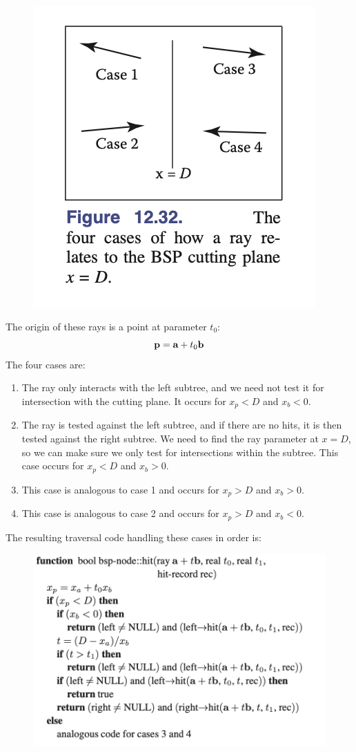 \documentclass[11pt]{article}
\numberwithin{equation}{section}
\begin{document}
	\begin{figure}[H]
	\centering
	\includegraphics[scale=0.6]{p14}
	\end{figure}
The origin of these rays is a point at parameter $t_0$:
$$\textbf{p} = \textbf{a} + t_0 \textbf{b}$$
The four cases are:
\begin{enumerate}
	\item The ray only interacts with the left subtree, and we need not test it for intersection with the cutting plane. It occurs for $x_p < D$ and $x_b < 0$.
	\item The ray is tested against the left subtree, and if there are no hits, it is then tested against the right subtree. We need to find the ray parameter at $x = D$, so we can make sure we only test for intersections within the subtree. This case occurs for $x_p < D$ and $x_b > 0$.
	\item This case is analogous to case 1 and occurs for $x_p > D$ and $x_b > 0$.
	\item This case is analogous to case 2 and occurs for $x_p > D$ and $x_b < 0$.
\end{enumerate}
The resulting traversal code handling these cases in order is:
	\begin{figure}[H]
	\centering
	\includegraphics[scale=0.6]{p15}
	\end{figure}
\end{document}
